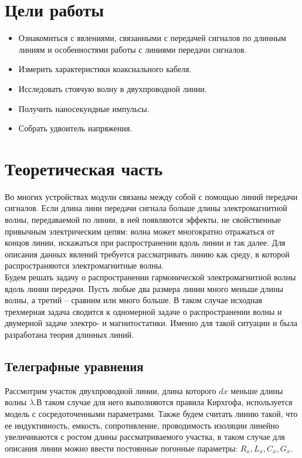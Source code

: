 \documentclass[12pt]{article}
\begin{document}
\begin{flushleft}
\section{ Цели работы}
\begin{itemize}
\item Ознакомиться с явлениями, связанными с передачей сигналов по длинным линиям и особенностями работы с линиями передачи сигналов.
\item Измерить характеристики коаксиального кабеля.
\item Исследовать стоячую волну в двухпроводной линии.
\item Получить наносекундные импульсы.
\item Собрать удвоитель напряжения.
\end{itemize}

\section{Теоретическая часть}
Во многих устройствах модули связаны между
собой с помощью линий передачи сигналов. Если длина лини  передачи сигнала больше длины электромагнитной волны, передаваемой по линии, в ней появляются эффекты, не
свойственные привычным электрическим цепям: волна может многократно отражаться от концов линии, искажаться
при распространении вдоль линии и так далее. Для описания данных явлений требуется рассматривать линию как среду, в которой распространяются электромагнитные волны.
\\
\vspace{1em}
Будем решать задачу о распространении гармонической электромагнитной волны вдоль линии передачи.
Пусть любые два размера линии много меньше длины волны, а третий – сравним или много больше. В таком случае исходная трехмерная задача сводится к одномерной задаче о распространении волны и двумерной задаче электро- и магнитостатики. Именно для такой ситуации и была разработана теория
длинных линий.

\subsection{Телеграфные уравнения}

Рассмотрим участок двухпроводной линии, длина которого $dx$ меньше длины волны $\lambda$.В таком случае для него выполняются правила Кирхгофа, используется модель с сосредоточенными параметрами. Также будем считать линию такой, что ее индуктивность, емкость, сопротивление, проводимость изоляции линейно увеличиваются с ростом длины рассматриваемого участка, в таком случае для описания линии можно ввести постоянные погонные параметры: $R_{x}, L_{x}, C_{x}, G_{x}$.


\end{flushleft}
\end{document}
